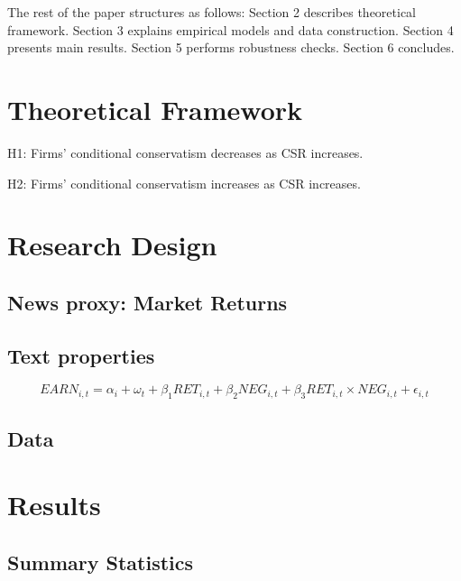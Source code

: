 \documentclass[a4paper]{article}
\begin{document}
\begin{spacing}{2}




The rest of the paper structures as follows: Section 2 describes theoretical framework. Section 3 explains empirical models and data construction. Section 4 presents main results. Section 5 performs robustness checks. Section 6 concludes. \cite{liTextualAnalysisCorporate2010}

\section{Theoretical Framework}

\begin{center}
	H1: Firms' conditional conservatism decreases as CSR increases.
\end{center}

\begin{center}
	H2: Firms' conditional conservatism increases as CSR increases.
\end{center}

\section{Research Design}
\subsection{News proxy: Market Returns}

\subsection{Text properties}

 \begin{equation}
 	EARN_{i,t}=\alpha_i+\omega_t+\beta_1RET_{i,t}+\beta_2NEG_{i,t}+\beta_3RET_{i,t}\times NEG_{i,t}+\epsilon_{i,t}
 \end{equation}

\subsection{Data}

\section{Results}

\subsection{Summary Statistics}


\end{spacing}
\end{document}
